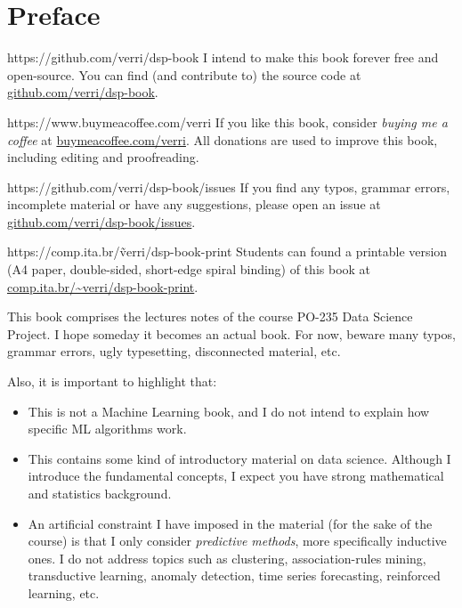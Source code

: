 \chapter{Preface}

\begin{parwithqr}{https://github.com/verri/dsp-book}
  I intend to make this book forever free and open-source. You can find (and contribute
  to) the source code at \href{\aurl}{github.com/verri/dsp-book}.
\end{parwithqr}

\vfill

\begin{parwithqr}{https://www.buymeacoffee.com/verri}
  If you like this book, consider \emph{buying me a coffee} at
  \href{\aurl}{buymeacoffee.com/verri}.   All donations are used to improve this book,
  including editing and proofreading.
\end{parwithqr}

\vfill

\begin{parwithqr}{https://github.com/verri/dsp-book/issues}
  If you find any typos, grammar errors, incomplete material or have any suggestions,
  please open an issue at \href{\aurl}{github.com/verri/dsp-book/issues}.
\end{parwithqr}

\vfill

\begin{parwithqr}{https://comp.ita.br/\~verri/dsp-book-print}
  Students can found a printable version (A4 paper, double-sided, short-edge spiral
  binding) of this book at \href{\aurl}{comp.ita.br/\textasciitilde{}verri/dsp-book-print}.
\end{parwithqr}

\newpage
This book comprises the lectures notes of the course PO-235 Data Science Project.
I hope someday it becomes an actual book. For now, beware many typos, grammar errors, ugly
typesetting, disconnected material, etc.

Also, it is important to highlight that:
\begin{itemize}
  \item This is not a Machine Learning book, and I do not intend to explain how specific
    ML algorithms work.
  \item This contains some kind of introductory material on data science.  Although I
    introduce the fundamental concepts, I expect you have strong mathematical and
    statistics background.
  \item An artificial constraint I have imposed in the material (for the sake of the
    course) is that I only consider \emph{predictive methods}, more specifically
    inductive ones. I do not address topics such as clustering, association-rules
    mining, transductive learning, anomaly detection, time series forecasting, reinforced
    learning, etc.
\end{itemize}

